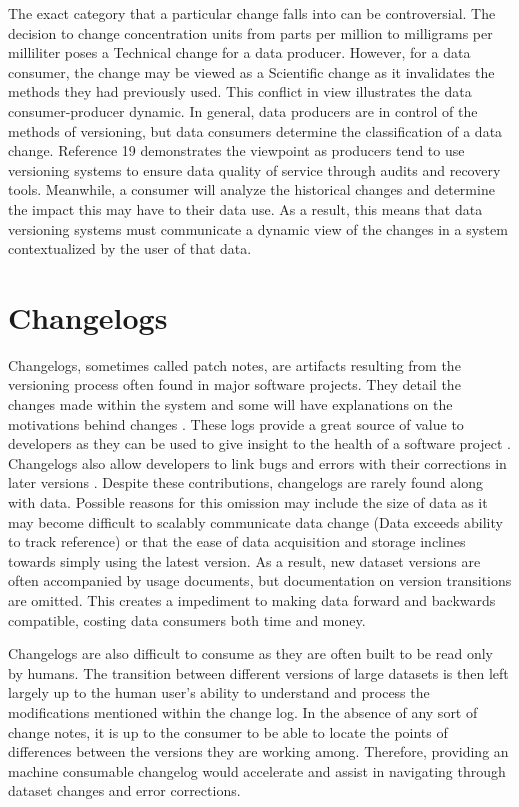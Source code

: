 The exact category that a particular change falls into can be controversial.
The decision to change concentration units from parts per million to milligrams per milliliter poses a Technical change for a data producer.
However, for a data consumer, the change may be viewed as a Scientific change as it invalidates the methods they had previously used.
This conflict in view illustrates the data consumer-producer dynamic.
In general, data producers are in control of the methods of versioning, but data consumers determine the classification of a data change.
Reference 19 demonstrates the viewpoint as producers tend to use versioning systems to ensure data quality of service through audits and recovery tools.
Meanwhile, a consumer will analyze the historical changes and determine the impact this may have to their data use.
As a result, this means that data versioning systems must communicate a dynamic view of the changes in a system contextualized by the user of that data.

\section{Changelogs}

Changelogs, sometimes called patch notes, are artifacts resulting from the versioning process often found in major software projects.
They detail the changes made within the system and some will have explanations on the motivations behind changes \cite{uel1037}.
These logs provide a great source of value to developers as they can be used to give insight to the health of a software project \cite{German03automatingthe} \cite{6132954}.
Changelogs also allow developers to link bugs and errors with their corrections in later versions \cite{Chen:2004:OCL:990374.990391}.
Despite these contributions, changelogs are rarely found along with data.
Possible reasons for this omission may include the size of data  as it may become difficult to scalably communicate data change (Data exceeds ability to track reference) or that the ease of data acquisition and storage inclines towards simply using the latest version.
As a result, new dataset versions are often accompanied by usage documents, but documentation on version transitions are omitted.
This creates a impediment to making data forward and backwards compatible, costing data consumers both time and money.

Changelogs are also difficult to consume as they are often built to be read only by humans.
The transition between different versions of large datasets is then left largely up to the human user's ability to understand and process the modifications mentioned within the change log.
In the absence of any sort of change notes, it is up to the consumer to be able to locate the points of differences between the versions they are working among.
Therefore, providing an machine consumable changelog would accelerate and assist in navigating through dataset changes and error corrections.

